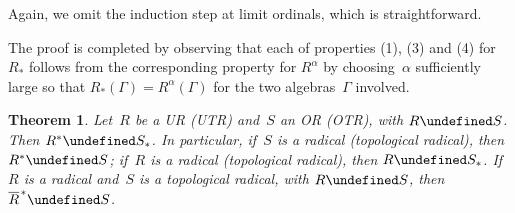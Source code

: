 \documentclass[11pt]{article}
\newcounter{arbenum}
\newenvironment{arbenumerate}{\begin{list}{{\rm(\arabic{arbenum})}}%
{\usecounter{arbenum}}}{\end{list}}
\newcommand{\ie}{i.e.\ }
\newcommand{\sseq}{\subseteq}
\let\leq\undefined  \let\geq\undefined
\let\le\leq   \let\ge\geq
\newcommand{\closure}[1]{\overline{#1}}
\newcommand{\al}{\alpha}
\newcommand{\lm}{\lambda}
\newcommand{\onto}{\twoheadrightarrow}
\newtheorem{thm}{Theorem}[section]
\newenvironment{Proof}{{\it Proof. }}{}%
\newcommand{\Detail}[1]{}
\newcommand{\Rstar}{R^*}
\newcommand{\Rsubstar}{R_*}
\newcommand{\barstar}[1]{{\closure{#1}\kern 1pt}^*}
\begin{document}
\begin{Proof}
Again, we omit the induction step at limit ordinals, which is straightforward.
\Detail{Suppose that $(2)_\al$,
$(3)_\al$ and $(4)_\al$ hold for all ordinals $\al < \lm$, where~$\lm$ is a
limit ordinal.   We show that $R^\lm$ satisfies (2), (3) and (4).
\begin{arbenumerate}
\addtocounter{arbenum}{1}
\item
For each $\al<\lm$ we have a natural continuous homomorphism
$A/R^\lm(A) \onto A/R^\al(A)$.  Applying $(3)_\al$ shows that
$R^\al(A/R^\lm(A))$ is mapped into $R^\al(A/R^\al(A))$, which is $(0)$,
by $(2)_\al$; \ie $R^\al(A/R^\lm(A))\sseq R^\al(A)/R^\lm(A)$.  Hence
$$R^\lm(A/R^\lm(A)) = \bigcap_{\al<\lm}R^\al(A/R^\lm(A))
    \sseq \bigcap_{\al<\lm}R^\al(A)/R^\lm(A) = R^\lm(A)/R^\lm(A) = (0).$$
\item If $A,B$ are Banach algebras and $\phi:A \onto B$ is a
continuous epimorphism, then, by $(3)_\al$, we have
$\phi(R^\al(A))\sseq R^\al(B)$, for each $\al<\lm$.  Therefore
$$\phi(R^\lm(A)) = \phi\left(\bigcap_{\al<\lm}R^\al(A)\right)
             \sseq \bigcap_{\al<\lm}\phi(R^\al(A))
             \sseq \bigcap_{\al<\lm}R^\al(B) = R^\lm(B).$$
\item
If $I$ is a closed ideal of~$A$ then $R^\al(I)$ is a closed ideal of~$A$ for
every $\al<\lm$.  Therefore $R^\lm(I) =\bigcap_{\al<\lm}R^\al(I)$ is a closed
ideal of~$A$.  Likewise, $R^\al(I) \sseq R^\al(A) \cap I$ for every $\al<\lm$,
whence, on taking intersections, $R^\lm(I) \sseq R^\lm(A) \cap I$.
\end{arbenumerate}}
The proof is completed by observing that each of
properties (1), (3) and (4) for $\Rsubstar$ follows from the corresponding property
for $R^\al$ by choosing~$\al$ sufficiently large so that $\Rsubstar(\Gamma) =
R^\al(\Gamma)$ for the two algebras~$\Gamma$ involved.
\end{Proof}

\begin{thm}\label{T4.1}
Let~$R$ be a UR (UTR) and~$S$ an OR (OTR), with $R \le S$.
Then $\Rstar \le S_*$.   In particular, if~$S$ is a radical (topological radical),
then $\Rstar \le S$; if~$R$ is a radical (topological radical), then $R \le S_*$.
If~$R$ is a radical and~$S$ is a topological radical, with $R\le S$, then
$\barstar R \le S$.
\end{thm}
\end{document}
